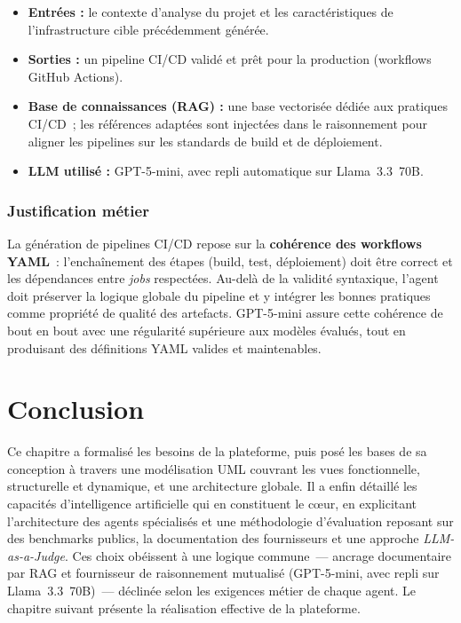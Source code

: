 \begin{itemize}
    \item \textbf{Entrées :} le contexte d'analyse du projet et les caractéristiques de
    l'infrastructure cible précédemment générée.
    \item \textbf{Sorties :} un pipeline CI/CD validé et prêt pour la production (workflows
    GitHub Actions).
    \item \textbf{Base de connaissances (RAG) :} une base vectorisée dédiée aux pratiques
    CI/CD~; les références adaptées sont injectées dans le raisonnement pour aligner les
    pipelines sur les standards de build et de déploiement.
    \item \textbf{LLM utilisé :} GPT-5-mini, avec repli automatique sur Llama~3.3~70B.
\end{itemize}

\subsubsection{Justification métier}

La génération de pipelines CI/CD repose sur la \textbf{cohérence des workflows YAML}~:
l'enchaînement des étapes (build, test, déploiement) doit être correct et les dépendances
entre \textit{jobs} respectées. Au-delà de la validité syntaxique, l'agent doit préserver la
logique globale du pipeline et y intégrer les bonnes pratiques comme propriété de qualité des
artefacts. GPT-5-mini assure cette cohérence de bout en bout avec une régularité supérieure
aux modèles évalués, tout en produisant des définitions YAML valides et maintenables.

\section{Conclusion}

Ce chapitre a formalisé les besoins de la plateforme, puis posé les bases de sa conception à
travers une modélisation UML couvrant les vues fonctionnelle, structurelle et dynamique, et
une architecture globale. Il a enfin détaillé les capacités d'intelligence artificielle qui
en constituent le c\oe ur, en explicitant l'architecture des agents spécialisés et une
méthodologie d'évaluation reposant sur des benchmarks publics, la documentation des
fournisseurs et une approche \textit{LLM-as-a-Judge}. Ces choix obéissent à une logique
commune~--- ancrage documentaire par RAG et fournisseur de raisonnement mutualisé
(GPT-5-mini, avec repli sur Llama~3.3~70B)~--- déclinée selon les exigences métier de chaque
agent. Le chapitre suivant présente la réalisation effective de la plateforme.
